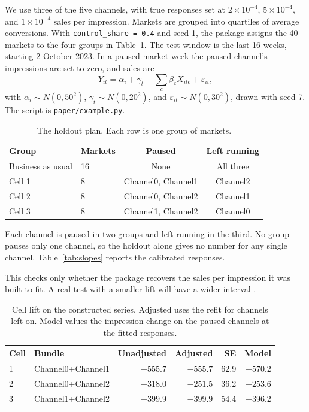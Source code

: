 \documentclass[preprint,12pt]{elsarticle}
\begin{document}
We use three of the five channels, with true responses set at $2\times 10^{-4}$, $5\times 10^{-4}$, and $1\times 10^{-4}$ sales per impression. Markets are grouped into quartiles of average conversions. With \texttt{control\_share = 0.4} and seed 1, the package assigns the 40 markets to the four groups in Table~\ref{tab:strategy}. The test window is the last 16 weeks, starting 2 October 2023. In a paused market-week the paused channel's impressions are set to zero, and sales are
\begin{equation}
\label{eq:sales}
Y_{it} = \alpha_{i} + \gamma_{t} + \sum_{c} \beta_{c} X_{itc} + \varepsilon_{it},
\end{equation}
with $\alpha_{i}\sim N(0,50^{2})$, $\gamma_{t}\sim N(0,20^{2})$, and $\varepsilon_{it}\sim N(0,30^{2})$, drawn with seed 7. The script is \texttt{paper/example.py}.

\begin{table}[t]
\centering
\caption{The holdout plan. Each row is one group of markets.}
\label{tab:strategy}
\small
\setlength{\tabcolsep}{5pt}
\begin{tabular}{llcc}
\toprule
Group & Markets & Paused & Left running \\
\midrule
Business as usual & 16 & None & All three \\
Cell 1 & 8 & Channel0, Channel1 & Channel2 \\
Cell 2 & 8 & Channel0, Channel2 & Channel1 \\
Cell 3 & 8 & Channel1, Channel2 & Channel0 \\
\bottomrule
\end{tabular}
\end{table}

Each channel is paused in two groups and left running in the third. No group pauses only one channel, so the holdout alone gives no number for any single channel. Table~\ref{tab:slopes} reports the calibrated responses.

This checks only whether the package recovers the sales per impression it was built to fit. A real test with a smaller lift will have a wider interval \cite{lewisrao2015}.

\begin{table}[t]
\centering
\caption{Cell lift on the constructed series. Adjusted uses the refit for channels left on. Model values the impression change on the paused channels at the fitted responses.}
\label{tab:cells}
\begin{tabular}{llrrrr}
\toprule
Cell & Bundle & Unadjusted & Adjusted & SE & Model \\
\midrule
1 & Channel0+Channel1 & $-555.7$ & $-555.7$ & 62.9 & $-570.2$ \\
2 & Channel0+Channel2 & $-318.0$ & $-251.5$ & 36.2 & $-253.6$ \\
3 & Channel1+Channel2 & $-399.9$ & $-399.9$ & 54.4 & $-396.2$ \\
\bottomrule
\end{tabular}
\end{table}
\end{document}
